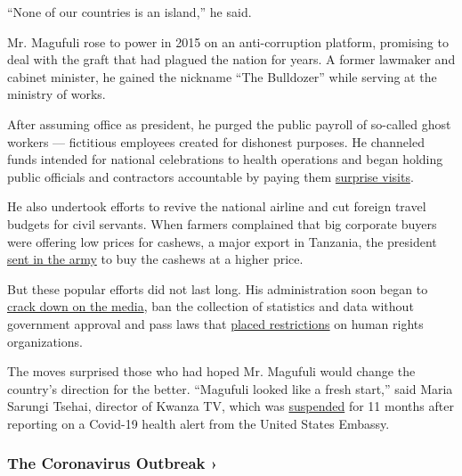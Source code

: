 ``None of our countries is an island,'' he said.

Mr. Magufuli rose to power in 2015 on an anti-corruption platform,
promising to deal with the graft that had plagued the nation for years.
A former lawmaker and cabinet minister, he gained the nickname ``The
Bulldozer'' while serving at the ministry of works.

After assuming office as president, he purged the public payroll of
so-called ghost workers --- fictitious employees created for dishonest
purposes. He channeled funds intended for national celebrations to
health operations and began holding public officials and contractors
accountable by paying them
\href{https://www.youtube.com/watch?v=4lDfz7s2HDQ}{surprise visits}.

He also undertook efforts to revive the national airline and cut foreign
travel budgets for civil servants. When farmers complained that big
corporate buyers were offering low prices for cashews, a major export in
Tanzania, the president
\href{https://www.bbc.com/news/world-africa-46180098}{sent in the army}
to buy the cashews at a higher price.

But these popular efforts did not last long. His administration soon
began to \href{https://cpj.org/africa/tanzania/}{crack down on the
media}, ban the collection of statistics and data without government
approval and pass laws that
\href{https://www.amnesty.org/en/latest/news/2019/06/tanzania-authorities-rushing-to-pass-bill-to-further-repress-human-rights/}{placed
restrictions} on human rights organizations.

The moves surprised those who had hoped Mr. Magufuli would change the
country's direction for the better. ``Magufuli looked like a fresh
start,'' said Maria Sarungi Tsehai, director of Kwanza TV, which was
\href{https://cpj.org/2020/07/tanzania-bans-kwanza-online-tv-for-11-months-citing-misleading-instagram-post-on-covid-19/}{suspended}
for 11 months after reporting on a Covid-19 health alert from the United
States Embassy.

\href{https://www.nytimes3xbfgragh.onion/news-event/coronavirus?action=click\&pgtype=Article\&state=default\&region=MAIN_CONTENT_3\&context=storylines_faq}{}

\hypertarget{the-coronavirus-outbreak-}{%
\subsubsection{The Coronavirus Outbreak
›}\label{the-coronavirus-outbreak-}}


